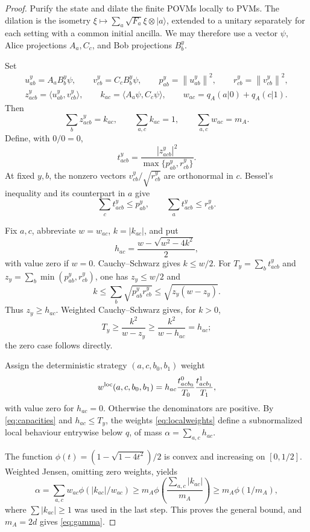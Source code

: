 \documentclass[11pt]{amsart}
\theoremstyle{remark}
\theoremstyle{plain}
\numberwithin{equation}{section}
\newcommand{\ket}[1]{\lvert#1\rangle}
\newcommand{\norm}[1]{\left\|#1\right\|}
\newcommand{\ip}[2]{\langle#1,#2\rangle}
\begin{document}
\begin{proof}
Purify the state and dilate the finite POVMs locally to PVMs.
The dilation is the isometry
\(\xi\mapsto\sum_a\sqrt{F_a}\xi\otimes\ket a\), extended to a unitary
separately for each setting with a common initial ancilla.
We may therefore use a vector \(\psi\), Alice projections \(A_a,C_c\),
and Bob projections \(B_b^y\).

Set
\[
 \begin{gathered}
 u_{ab}^y=A_aB_b^y\psi,\qquad
 v_{cb}^y=C_cB_b^y\psi,\qquad
 p_{ab}^y=\norm{u_{ab}^y}^2,\qquad
 r_{cb}^y=\norm{v_{cb}^y}^2,\\
 z_{acb}^y=\ip{u_{ab}^y}{v_{cb}^y},\qquad
 k_{ac}=\ip{A_a\psi}{C_c\psi},\qquad
 w_{ac}=q_A(a|0)+q_A(c|1).
 \end{gathered}
\]
Then
\[
 \sum_bz_{acb}^y=k_{ac},\qquad
 \sum_{a,c}k_{ac}=1,\qquad
 \sum_{a,c}w_{ac}=m_A.
\]
Define, with \(0/0=0\),
\[
 t_{acb}^y=\frac{|z_{acb}^y|^2}
                  {\max\{p_{ab}^y,r_{cb}^y\}}.
\]
At fixed \(y,b\), the nonzero vectors
\(v_{cb}^y/\sqrt{r_{cb}^y}\) are orthonormal in \(c\).
Bessel's inequality and its counterpart in \(a\) give
\begin{equation}\label{eq:capacities}
 \sum_ct_{acb}^y\le p_{ab}^y,\qquad
 \sum_at_{acb}^y\le r_{cb}^y.
\end{equation}

Fix \(a,c\), abbreviate \(w=w_{ac}\), \(k=|k_{ac}|\), and put
\[
 h_{ac}=\frac{w-\sqrt{w^2-4k^2}}2,
\]
with value zero if \(w=0\).
Cauchy--Schwarz gives \(k\le w/2\).
For \(T_y=\sum_bt_{acb}^y\) and
\(z_y=\sum_b\min(p_{ab}^y,r_{cb}^y)\), one has \(z_y\le w/2\) and
\[
 k\le\sum_b\sqrt{p_{ab}^yr_{cb}^y}
 \le\sqrt{z_y(w-z_y)}.
\]
Thus \(z_y\ge h_{ac}\). Weighted Cauchy--Schwarz gives, for \(k>0\),
\[
 T_y\ge\frac{k^2}{w-z_y}
 \ge\frac{k^2}{w-h_{ac}}=h_{ac};
\]
the zero case follows directly.

Assign the deterministic strategy \((a,c,b_0,b_1)\) weight
\begin{equation}\label{eq:localweights}
 w^{\rm loc}(a,c,b_0,b_1)=
 h_{ac}\frac{t_{acb_0}^0}{T_0}\frac{t_{acb_1}^1}{T_1},
\end{equation}
with value zero for \(h_{ac}=0\).
Otherwise the denominators are positive.
By \eqref{eq:capacities} and \(h_{ac}\le T_y\), the weights
\eqref{eq:localweights} define a subnormalized local behaviour
entrywise below \(q\), of mass \(\alpha=\sum_{a,c}h_{ac}\).

The function \(\phi(t)=(1-\sqrt{1-4t^2})/2\) is convex and increasing
on \([0,1/2]\). Weighted Jensen, omitting zero weights, yields
\[
 \alpha=\sum_{a,c}w_{ac}\phi(|k_{ac}|/w_{ac})
 \ge m_A\phi\!\left(\frac{\sum_{a,c}|k_{ac}|}{m_A}\right)
 \ge m_A\phi(1/m_A),
\]
where \(\sum|k_{ac}|\ge1\) was used in the last step.
This proves the general bound, and \(m_A=2d\) gives \eqref{eq:gamma}.
\end{proof}
\end{document}
